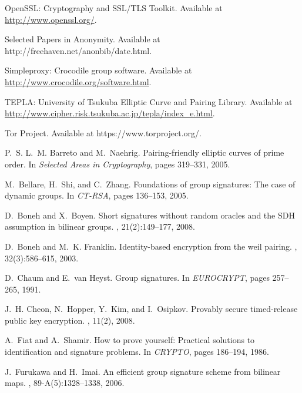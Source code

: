 \documentclass[preprint]{sig-alternate}
\begin{document}
\begin{thebibliography}{10}

{OpenSSL}: {C}ryptography and {SSL/TLS} {T}oolkit.
\newblock Available at \url{http://www.openssl.org/}.

{Selected Papers in Anonymity}.
\newblock Available at http://freehaven.net/anonbib/date.html.

{Simpleproxy}: Crocodile group software.
\newblock Available at \url{http://www.crocodile.org/software.html}.

{TEPLA}: {U}niversity of {T}sukuba {E}lliptic {C}urve and {P}airing {L}ibrary.
\newblock Available at
  \url{http://www.cipher.risk.tsukuba.ac.jp/tepla/index_e.html}.

{Tor Project}.
\newblock Available at https://www.torproject.org/.

\bibitem{[BarretoN05]}
P.~S. L.~M. Barreto and M.~Naehrig.
\newblock Pairing-friendly elliptic curves of prime order.
\newblock In {\em Selected Areas in Cryptography}, pages 319--331, 2005.

\bibitem{[BellareSZ05]}
M.~Bellare, H.~Shi, and C.~Zhang.
\newblock Foundations of group signatures: The case of dynamic groups.
\newblock In {\em CT-RSA}, pages 136--153, 2005.

\bibitem{[BonehB08]}
D.~Boneh and X.~Boyen.
\newblock Short signatures without random oracles and the {SDH} assumption in
  bilinear groups.
, 21(2):149--177, 2008.

\bibitem{[BonehF03]}
D.~Boneh and M.~K. Franklin.
\newblock Identity-based encryption from the weil pairing.
, 32(3):586--615, 2003.

\bibitem{[ChaumH91]}
D.~Chaum and E.~van Heyst.
\newblock Group signatures.
\newblock In {\em EUROCRYPT}, pages 257--265, 1991.

\bibitem{[CheonHKO08]}
J.~H. Cheon, N.~Hopper, Y.~Kim, and I.~Osipkov.
\newblock Provably secure timed-release public key encryption.
, 11(2), 2008.

\bibitem{[FiatS86]}
A.~Fiat and A.~Shamir.
\newblock How to prove yourself: Practical solutions to identification and
  signature problems.
\newblock In {\em CRYPTO}, pages 186--194, 1986.

\bibitem{[FurukawaI06]}
J.~Furukawa and H.~Imai.
\newblock An efficient group signature scheme from bilinear maps.
, 89-A(5):1328--1338, 2006.


\end{thebibliography}
\end{document}
